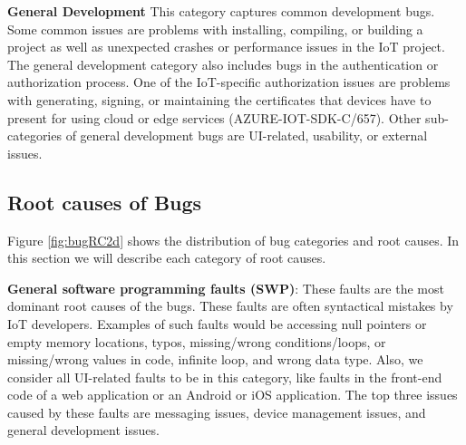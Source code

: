 \textbf{General Development}
This category captures common development bugs. Some common issues are problems with installing, compiling, or building a project as well as unexpected crashes or performance issues in the IoT project. The general development category also includes bugs in the authentication or authorization process. One of the IoT-specific authorization issues are problems with generating, signing, or maintaining the certificates that devices have to present for using cloud or edge services (AZURE-IOT-SDK-C/657). Other sub-categories of general development bugs are UI-related, usability, or external issues.

\subsection{Root causes of Bugs}


Figure \ref{fig:bugRC2d} shows the distribution of bug categories and root causes. In this section we will describe each category of root causes. 

\textbf{General software programming faults (SWP)}: These faults are the most dominant root causes of the bugs. These faults are often syntactical mistakes by IoT developers. Examples of such faults would be accessing null pointers or empty memory locations, typos, missing/wrong conditions/loops, or missing/wrong values in code, infinite loop, and wrong data type. Also, we consider all UI-related faults to be in this category, like faults in the front-end code of a web application or an Android or iOS application. The top three issues caused by these faults are messaging issues, device management issues, and general development issues.


